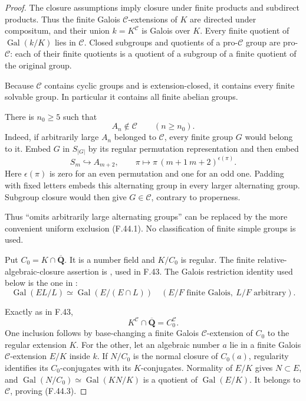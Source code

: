 \begin{proof}

The closure assumptions imply closure under finite products and subdirect products. Thus the finite Galois \(\mathcal C\)-extensions of \(K\) are directed under compositum, and their union \(k=K^{\mathcal C}\) is Galois over \(K\). Every finite quotient of \(\operatorname{Gal}(k/K)\) lies in \(\mathcal C\). Closed subgroups and quotients of a pro-\(\mathcal C\) group are pro-\(\mathcal C\): each of their finite quotients is a quotient of a subgroup of a finite quotient of the original group.

Because \(\mathcal C\) contains cyclic groups and is extension-closed, it contains every finite solvable group. In particular it contains all finite abelian groups.

There is \(n_0\ge5\) such that
\[
 A_n\notin\mathcal C \qquad (n\ge n_0).
 \tag{F.44.1}
\]
Indeed, if arbitrarily large \(A_n\) belonged to \(\mathcal C\), every finite group \(G\) would belong to it. Embed \(G\) in \(S_{|G|}\) by its regular permutation representation and then embed
\[
 S_m\hookrightarrow A_{m+2},\qquad
 \pi\longmapsto \pi\,(m+1\ m+2)^{\epsilon(\pi)}.
\]
Here \(\epsilon(\pi)\) is zero for an even permutation and one for an odd one. Padding with fixed letters embeds this alternating group in every larger alternating group. Subgroup closure would then give \(G\in\mathcal C\), contrary to properness.

Thus “omits arbitrarily large alternating groups” can be replaced by the more convenient uniform exclusion \textup{(F.44.1)}. No classification of finite simple groups is used.


Put \(C_0=K\cap\overline{\mathbf Q}\). It is a number field and \(K/C_0\) is regular. The finite relative-algebraic-closure assertion is \citet[Lemma~9.26.11]{F_StacksFields}, used in F.43. The Galois restriction identity used below is the one in \citet[Proposition~7.15 and Corollary~7.16, p.~99]{F_MilneFT2022}:
\[
 \operatorname{Gal}(EL/L)\simeq
 \operatorname{Gal}(E/(E\cap L))
 \quad(E/F\text{ finite Galois},\ L/F\text{ arbitrary}).
 \tag{F.44.2}
\]

Exactly as in F.43,
\[
             K^{\mathcal C}\cap\overline{\mathbf Q}
                       =C_0^{\mathcal C}.
 \tag{F.44.3}
\]
One inclusion follows by base-changing a finite Galois \(\mathcal C\)-extension of \(C_0\) to the regular extension \(K\). For the other, let an algebraic number \(a\) lie in a finite Galois \(\mathcal C\)-extension \(E/K\) inside \(k\). If \(N/C_0\) is the normal closure of \(C_0(a)\), regularity identifies its \(C_0\)-conjugates with its \(K\)-conjugates. Normality of \(E/K\) gives \(N\subset E\), and \(\operatorname{Gal}(N/C_0)\simeq\operatorname{Gal}(KN/K)\) is a quotient of \(\operatorname{Gal}(E/K)\). It belongs to \(\mathcal C\), proving \textup{(F.44.3)}.


\end{proof}
